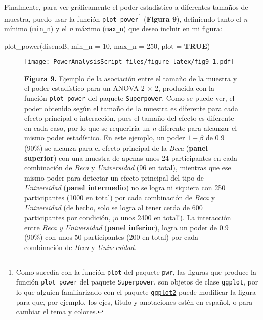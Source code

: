 \documentclass[
]{article}
\newenvironment{Shaded}{\begin{snugshade}}{\end{snugshade}}
\newcommand{\AttributeTok}[1]{\textcolor[rgb]{0.16,0.50,0.73}{#1}}
\newcommand{\ConstantTok}[1]{\textcolor[rgb]{0.15,0.68,0.68}{\textbf{#1}}}
\newcommand{\DecValTok}[1]{\textcolor[rgb]{0.96,0.45,0.00}{#1}}
\newcommand{\FunctionTok}[1]{\textcolor[rgb]{0.56,0.27,0.68}{#1}}
\newcommand{\NormalTok}[1]{\textcolor[rgb]{0.81,0.81,0.76}{#1}}
\begin{document}
Finalmente, para ver gráficamente el poder estadístico a diferentes
tamaños de muestra, puedo usar la función
\texttt{plot\_power}\footnote{Como sucedía con la función \texttt{plot}
  del paquete \texttt{pwr}, las figuras que produce la función
  \texttt{plot\_power} del paquete \texttt{Superpower}, son objetos de
  clase \texttt{ggplot}, por lo que alguien familiarizado con el paquete
  \href{https://ggplot2.tidyverse.org/}{\texttt{ggplot2}} puede
  modificar la figura para que, por ejemplo, los ejes, título y
  anotaciones estén en español, o para cambiar el tema y colores.}
(\textbf{Figura 9}), definiendo tanto el \emph{n} mínimo
(\texttt{min\_n}) y el \emph{n} máximo (\texttt{max\_n}) que deseo
incluir en mi figura:

\begin{Shaded}
\begin{Highlighting}[]
\FunctionTok{plot\_power}\NormalTok{(disenoB, }
           \AttributeTok{min\_n =} \DecValTok{10}\NormalTok{, }\AttributeTok{max\_n =} \DecValTok{250}\NormalTok{, }
           \AttributeTok{plot =} \ConstantTok{TRUE}\NormalTok{)}
\end{Highlighting}
\end{Shaded}

\begin{figure}
\centering
\texttt{[image: PowerAnalysisScript\_files/figure-latex/fig9-1.pdf]}
\caption{\textbf{Figura 9.} Ejemplo de la asociación entre el tamaño de
la muestra y el poder estadístico para un ANOVA 2 \(\times\) 2,
producida con la función \texttt{plot\_power} del paquete
\texttt{Superpower}. Como se puede ver, el poder obtenido según el
tamaño de la muestra es diferente para cada efecto principal o
interacción, pues el tamaño del efecto es diferente en cada caso, por lo
que se requeriría un \emph{n} diferente para alcanzar el mismo poder
estadístico. En este ejemplo, un poder \(1-\beta\) de 0.9 (90\%) se
alcanza para el efecto principal de la \emph{Beca} (\textbf{panel
superior}) con una muestra de apenas unos 24 participantes en cada
combinación de \emph{Beca} y \emph{Universidad} (96 en total), mientras
que ese mismo poder para detectar un efecto principal del tipo de
\emph{Universidad} (\textbf{panel intermedio}) no se logra ni siquiera
con 250 participantes (1000 en total) por cada combinación de
\emph{Beca} y \emph{Universidad} (de hecho, solo se logra al tener cerda
de 600 participantes por condición, ¡o unos 2400 en total!). La
interacción entre \emph{Beca y Universidad} (\textbf{panel inferior}),
logra un poder de 0.9 (90\%) con unos 50 participantes (200 en total)
por cada combinación de \emph{Beca} y \emph{Universidad}.}
\end{figure}
\end{document}
